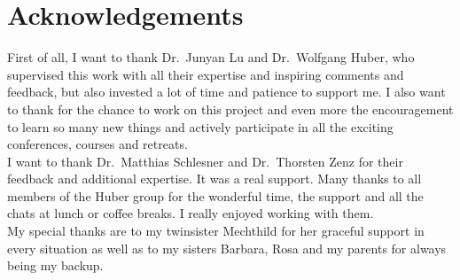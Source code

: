 \section*{Acknowledgements}

First of all, I want to thank Dr.~Junyan Lu and Dr.~Wolfgang Huber, who supervised this work with all their expertise and inspiring comments and feedback, but also invested a lot of time and patience to support me. I also want to thank for the chance to work on this project and even more the encouragement to learn so many new things and actively participate in all the exciting conferences, courses and retreats.\\
I want to thank Dr.~Matthias Schlesner and Dr.~Thorsten Zenz for their feedback and additional expertise. It was a real support. 
Many thanks to all members of the Huber group for the wonderful time, the support and all the chats at lunch or coffee breaks. I really enjoyed working with them. \\
My special thanks are to my twinsister Mechthild for her graceful support in every situation as well as to my sisters Barbara, Rosa and my parents for always being my backup.   

